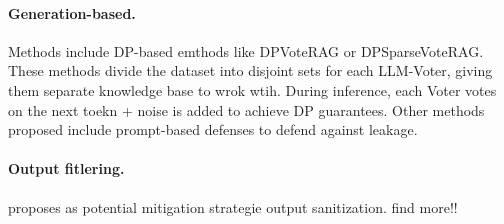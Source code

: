 \paragraph{Generation-based.} Methods include DP-based emthods like DPVoteRAG or DPSparseVoteRAG. These methods divide the dataset into disjoint sets for each LLM-Voter, giving them separate knowledge base to wrok wtih. During inference, each Voter votes on the next toekn + noise is added to achieve DP guarantees. \cite{DPVoteRAG} Other methods proposed include prompt-based defenses \cite{goodAndBad} to defend against leakage.

\paragraph{Output fitlering.} %
\cite{ragThief} proposes as potential mitigation strategie output sanitization. find more!!



